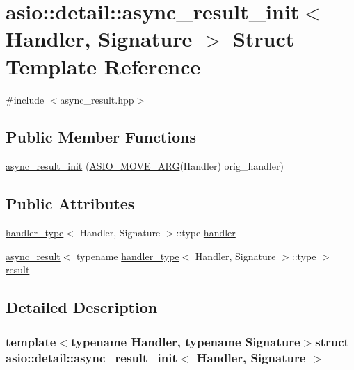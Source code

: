 \hypertarget{structasio_1_1detail_1_1async__result__init}{}\section{asio\+:\+:detail\+:\+:async\+\_\+result\+\_\+init$<$ Handler, Signature $>$ Struct Template Reference}
\label{structasio_1_1detail_1_1async__result__init}


{\ttfamily \#include $<$async\+\_\+result.\+hpp$>$}

\subsection*{Public Member Functions}
\begin{DoxyCompactItemize}
\item 
\hyperlink{structasio_1_1detail_1_1async__result__init_a4c1ad81be7a8fdaa35f1795095cff6a4}{async\+\_\+result\+\_\+init} (\hyperlink{group__async__read_ga6d72a97784dde9476c6d93b8904a4967}{A\+S\+I\+O\+\_\+\+M\+O\+V\+E\+\_\+\+A\+R\+G}(Handler) orig\+\_\+handler)
\end{DoxyCompactItemize}
\subsection*{Public Attributes}
\begin{DoxyCompactItemize}
\item 
\hyperlink{structasio_1_1handler__type}{handler\+\_\+type}$<$ Handler, Signature $>$\+::type \hyperlink{structasio_1_1detail_1_1async__result__init_a98d6b00c3b24c37ea22b5293b70e4005}{handler}
\item 
\hyperlink{classasio_1_1async__result}{async\+\_\+result}$<$ typename \hyperlink{structasio_1_1handler__type}{handler\+\_\+type}$<$ Handler, Signature $>$\+::type $>$ \hyperlink{structasio_1_1detail_1_1async__result__init_a6b805f5a8bcfddb4f6766b0fb7f0d837}{result}
\end{DoxyCompactItemize}


\subsection{Detailed Description}
\subsubsection*{template$<$typename Handler, typename Signature$>$struct asio\+::detail\+::async\+\_\+result\+\_\+init$<$ Handler, Signature $>$}



